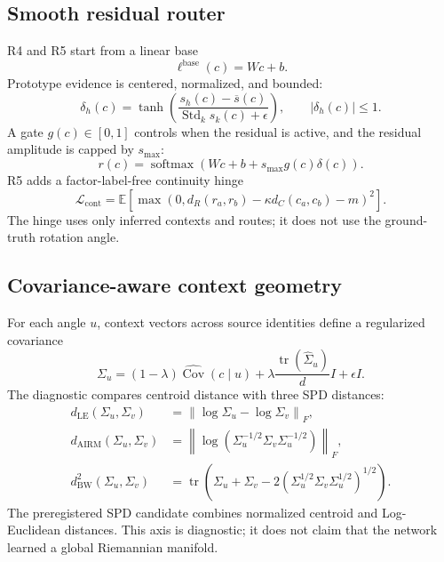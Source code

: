 \documentclass[11pt,a4paper]{article}
\newcommand{\E}{\mathbb{E}}
\newcommand{\loss}{\mathcal{L}}
\newcommand{\norm}[1]{\left\lVert #1 \right\rVert}
\newcommand{\softmax}{\operatorname{softmax}}
\begin{document}
\subsection{Smooth residual router}
R4 and R5 start from a linear base
\begin{equation}
 \ell^{\mathrm{base}}(c)=Wc+b.
\end{equation}
Prototype evidence is centered, normalized, and bounded:
\begin{equation}
 \delta_h(c)=\tanh\!\left(
 \frac{s_h(c)-\overline{s}(c)}{\operatorname{Std}_k s_k(c)+\epsilon}
 \right),
 \qquad |\delta_h(c)|\le 1.
\end{equation}
A gate $g(c)\in[0,1]$ controls when the residual is active, and the residual amplitude is capped by $s_{\max}$:
\begin{equation}
 r(c)=\softmax\!\left(Wc+b+s_{\max}g(c)\delta(c)\right).
\end{equation}
R5 adds a factor-label-free continuity hinge
\begin{equation}
 \loss_{\mathrm{cont}}=
 \E\left[
 \max\left(
 0,
 d_R(r_a,r_b)-\kappa d_C(c_a,c_b)-m
 \right)^2
 \right].
\end{equation}
The hinge uses only inferred contexts and routes; it does not use the ground-truth rotation angle.

\subsection{Covariance-aware context geometry}
For each angle $u$, context vectors across source identities define a regularized covariance
\begin{equation}
 \Sigma_u=(1-\lambda)\widehat{\operatorname{Cov}}(c\mid u)
 +\lambda\frac{\operatorname{tr}(\widehat\Sigma_u)}{d}I+\epsilon I.
\end{equation}
The diagnostic compares centroid distance with three SPD distances:
\begin{align}
 d_{\mathrm{LE}}(\Sigma_u,\Sigma_v)
 &=\norm{\log\Sigma_u-\log\Sigma_v}_F,\\
 d_{\mathrm{AIRM}}(\Sigma_u,\Sigma_v)
 &=\norm{\log(\Sigma_u^{-1/2}\Sigma_v\Sigma_u^{-1/2})}_F,\\
 d_{\mathrm{BW}}^2(\Sigma_u,\Sigma_v)
 &=\operatorname{tr}\!\left(\Sigma_u+\Sigma_v
 -2(\Sigma_u^{1/2}\Sigma_v\Sigma_u^{1/2})^{1/2}\right).
\end{align}
The preregistered SPD candidate combines normalized centroid and Log-Euclidean distances. This axis is diagnostic; it does not claim that the network learned a global Riemannian manifold.
\end{document}
